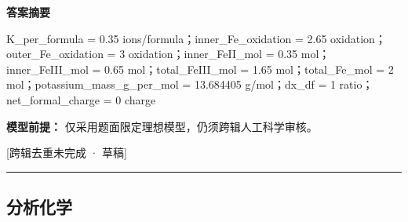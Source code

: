 \documentclass[UTF8,11pt,a4paper]{ctexart}
\begin{document}
\noindent\textbf{答案摘要}\par
K\_per\_formula = 0.35 ions/formula；inner\_Fe\_oxidation = 2.65 oxidation；outer\_Fe\_oxidation = 3 oxidation；inner\_FeII\_mol = 0.35 mol；inner\_FeIII\_mol = 0.65 mol；total\_FeIII\_mol = 1.65 mol；total\_Fe\_mol = 2 mol；potassium\_mass\_g\_per\_mol = 13.684405 g/mol；dx\_df = 1 ratio；net\_formal\_charge = 0 charge\par
\noindent\textbf{模型前提：}
仅采用题面限定理想模型，仍须跨辑人工科学审核。\par
\noindent\textcolor{red!65!black}{[跨辑去重未完成 · 草稿]} \par
\medskip\hrule\medskip
\subsection*{分析化学}
\end{document}
